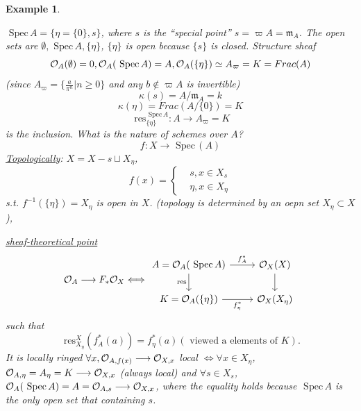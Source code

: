 \documentclass[11pt]{article}
\newtheorem{ex}[thm]{Example}
\newcommand{\spec}{\text{ Spec}\,}
\newcommand{\res}{\text{ res}}
\newcommand{\scm}{{\mathfrak m}}
\newcommand{\calo}{{\cal O}}
\newcommand{\lrta}{\longrightarrow}
\newcommand{\Llrta}{\Longleftrightarrow}
\begin{document}
\begin{ex}
\begin{enumerate}[label=(\arabic*)]
$\spec A=\{\eta=\{0\},s\}$, where $s$ is  the ``special point'' $s=\varpi A=\scm_A$. The open sets are $\emptyset, \spec A, \{\eta\}$, $\{\eta\}$ is open because $\{s\}$ is closed. Structure sheaf
$$
\calo_A(\emptyset)=0,\calo_A(\spec A)=A, \calo_A(\{\eta\})\simeq A_\varpi=K=Frac(A)
$$
(since $A_\varpi=\{\frac{a}{\pi^n}|n\geq 0\}$ and any $b\notin \varpi A$ is invertible)
$$
\kappa(s)=A/\scm_A=k
$$
$$
\kappa(\eta)=Frac(A/\{0\})=K
$$
$$
\res^{\spec A}_{\{\eta\}}:A\lrta A_\varpi=K
$$
is the inclusion. What is the nature of schemes over $A$?
$$
f:X\lrta \spec(A)
$$
\underline{Topologically}: $X=X-s\sqcup X_\eta$,
$$
f(x)=\left\{\begin{aligned}
&s, x\in X_s\\
& \eta, x\in X_\eta
\end{aligned}\right.
$$
s.t. $f^{-1}(\{\eta\})=X_\eta$ is open in $X$. (topology is determined by an oepn set $X_\eta\subset X$),

\underline{sheaf-theoretical point}
$$
\calo_A\lrta F_*\calo_X\Llrta \begin{tikzcd}
A=\calo_A(\spec A) \arrow[r, "f^*_A"] \arrow[d, "\res"'] & \calo_X(X) \arrow[d] \\
K=\calo_A(\{\eta\}) \arrow[r, "f^*_\eta"'] & \calo_X(X_\eta)
\end{tikzcd}
$$
such that 
$$
\res^X_{X_\eta}(f^*_A(a))=f^*_\eta(a)(\text{ viewed a elements of }K).
$$
It is locally ringed $\forall x, \calo_{A,f(x)}\lrta \calo_{X,x}$ local $\Llrta \forall x\in X_\eta$, $\calo_{A,\eta}=A_\eta=K\lrta \calo_{X,x}$ (always local) and 
$\forall s\in X_s$, $\calo_A(\spec A)=A=\calo_{A,s}\lrta \calo_{X,x}$, where the equality holds because $\spec A$ is the only open set that containing $s$.
\end{enumerate}
\end{ex} 
\end{document}
